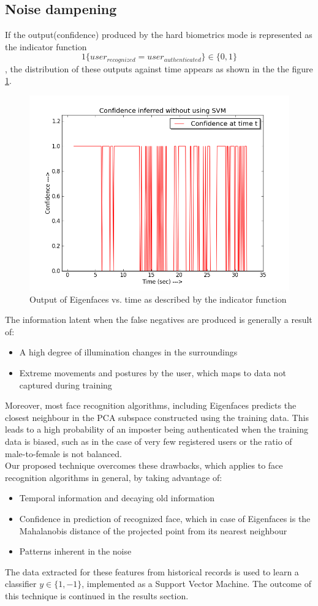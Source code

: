 \documentclass[%
        final,
        notitlepage,
        narroweqnarray,
        inline,
        ]{ieee}
\begin{document}
\subsection{Noise dampening}
If the output(confidence) produced by the hard biometrics mode is represented as the indicator function
$$ 1\{user_{recognized} = user_{authenticated}\} \in \{0,1\}$$,
the distribution of these outputs against time appears as shown in the the figure \ref{fig:no_svm}.
\begin{figure}[h!]
	\centering
	\includegraphics[scale=0.4]{img/no_svm.png}
	\caption{Output of Eigenfaces vs. time as described by the indicator function}
	\label{fig:no_svm}
\end{figure}
The information latent when the false negatives are produced is generally a result of:
\begin{itemize}
	\item A high degree of illumination changes in the surroundings
	\item Extreme movements and postures by the user, which maps to data not captured during training
\end{itemize}
Moreover, most face recognition algorithms, including Eigenfaces predicts the closest neighbour in the PCA subspace constructed using the training data.
This leads to a high probability of an imposter being authenticated when the training data is biased, such as in the case of very few registered users or the ratio of male-to-female is not balanced.\\
Our proposed technique overcomes these drawbacks, which applies to face recognition algorithms in general, by taking advantage of:
\begin{itemize}
	\item Temporal information and decaying old information
	\item Confidence in prediction of recognized face, which in case of Eigenfaces is the Mahalanobis distance of the projected point from its nearest neighbour
	\item Patterns inherent in the noise
\end{itemize}
The data extracted for these features from historical records is used to learn a classifier $y \in \{1,-1\}$, implemented as a Support Vector Machine. The outcome of this technique is continued in the results section.
\end{document}
